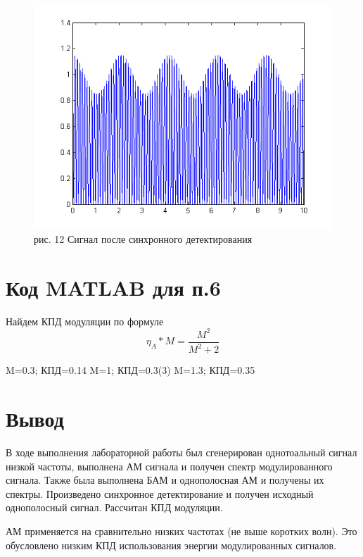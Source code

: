 \documentclass[10pt,a4paper]{report}
\begin{document}
\begin{figure}
\begin{center}
\includegraphics[angle=0, scale = 0.8]{3_1.png}\newline
рис. 12  Сигнал после синхронного детектирования\newline
\end{center}
\end{figure}
\chapter{Код MATLAB для п.6}
Найдем КПД модуляции по формуле
\begin{displaymath}
\eta_{A}*M=\frac{M^{2}}{M^{2}+2}
\end{displaymath}
\begin{center}
M=0.3; КПД=0.14\newline
M=1; КПД=0.3(3)\newline
M=1.3; КПД=0.35\newline
\end{center}
\chapter{Вывод}
В ходе выполнения лабораторной работы был сгенерирован однотоальный сигнал низкой частоты, выполнена АМ сигнала и получен спектр модулированного сигнала. Также была выполнена БАМ и однополосная АМ и получены их спектры. Произведено синхронное детектирование и получен исходный однополосный сигнал. Рассчитан КПД модуляции.

АМ применяется на сравнительно низких частотах (не выше коротких волн). Это обусловлено низким КПД использования энергии модулированных сигналов.
\end{document}
